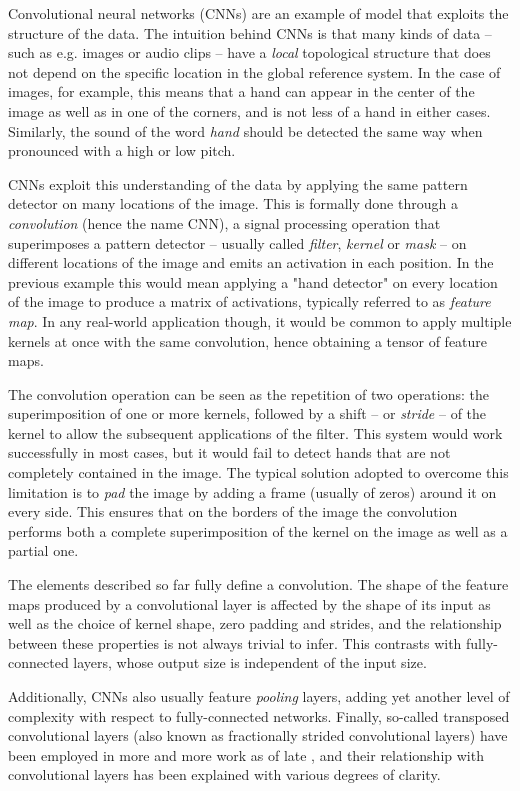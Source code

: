 Convolutional neural networks (CNNs) are an example of model that exploits the
structure of the data. The intuition behind CNNs is that many kinds of data --
such as e.g. images or audio clips -- have a \emph{local} topological structure
that does not depend on the specific location in the global reference system.
In the case of images, for example, this means that a hand can appear in the
center of the image as well as in one of the corners, and is not less of a hand
in either cases. Similarly, the sound of the word \emph{hand} should be
detected the same way when pronounced with a high or low pitch.

CNNs exploit this understanding of the data by applying the same pattern
detector on many locations of the image. This is formally done through a
\emph{convolution} (hence the name CNN), a signal processing operation that
superimposes a pattern detector -- usually called \emph{filter}, \emph{kernel}
or \emph{mask} -- on different locations of the image and emits an activation
in each position. In the previous example this would mean applying a "hand
detector" on every location of the image to produce a matrix of activations,
typically referred to as \emph{feature map}. In any real-world application
though, it would be common to apply multiple kernels at once with the same
convolution, hence obtaining a tensor of feature maps.

The convolution operation can be seen as the repetition of two operations: the
superimposition of one or more kernels, followed by a shift -- or \emph{stride}
-- of the kernel to allow the subsequent applications of the filter. This
system would work successfully in most cases, but it would fail to detect hands
that are not completely contained in the image. The typical solution adopted to
overcome this limitation is to \emph{pad} the image by adding a frame (usually
of zeros) around it on every side. This ensures that on the borders of the
image the convolution performs both a complete superimposition of the kernel on
the image as well as a partial one.

The elements described so far fully define a convolution. The shape of the
feature maps produced by a convolutional layer is affected by the shape of its
input as well as the choice of kernel shape, zero padding and strides, and the
relationship between these properties is not always trivial to infer. This
contrasts with fully-connected layers, whose output size is independent of the
input size.

Additionally, CNNs also usually feature {\em pooling\/} layers, adding yet
another level of complexity with respect to fully-connected networks. Finally,
so-called transposed convolutional layers (also known as fractionally strided
convolutional layers) have been employed in more and more work as of late
\citep{zeiler2011adaptive,zeiler2014visualizing,
long2015fully,radford2015unsupervised,visin15,im2016generating}, and their
relationship with convolutional layers has been explained with various degrees
of clarity.

